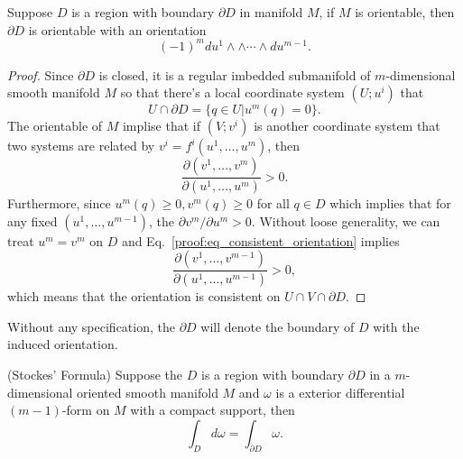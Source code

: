 \begin{theorem}
Suppose $D$ is a region with boundary $\partial D$ in manifold $M$, if $M$ is orientable, then $\partial D$ is orientable with an orientation
\begin{equation}
(-1)^mdu^1\wedge\wedge\cdots\wedge du^{m-1}.
\end{equation}
\end{theorem}
\begin{proof}
Since $\partial D$ is closed, it is a regular imbedded submanifold of $m$-dimensional smooth manifold $M$ so that there's a local coordinate system $(U;u^i)$ that
\begin{equation}
U\cap\partial D=\{q\in U|u^m(q)=0\}.
\end{equation}
The orientable of $M$ implise that if $(V;v^i)$ is another coordinate system that two systems are related by $v^i=f^i(u^1,\dots,u^m)$, then
\begin{equation}
\frac{\partial(v^1,\dots,v^m)}{\partial(u^1,\dots,u^m)}>0.
\end{equation}\label{proof:eq_consistent_orientation}
Furthermore, since $u^m(q)\ge 0,v^m(q)\ge 0$ for all $q\in D$ which implies that for any fixed $(u^1,\dots,u^{m-1})$, the $\partial v^m/\partial u^m>0$. Without loose generality, we can treat $u^m=v^m$ on $D$ and Eq.~\ref{proof:eq_consistent_orientation} implies
\begin{equation}
\frac{\partial(v^1,\dots,v^{m-1})}{\partial(u^1,\dots,u^{m-1})}>0,
\end{equation}
which means that the orientation is consistent on $U\cap V\cap \partial D$.
\end{proof}

Without any specification, the $\partial D$ will denote the boundary of $D$ with the induced orientation. 

\begin{theorem}(Stockes' Formula)
Suppose the $D$ is a region with boundary $\partial D$ in a $m$-dimensional oriented smooth manifold $M$ and $\omega$ is a exterior differential $(m-1)$-form on $M$ with a compact support, then
\begin{equation}
\int_Dd\omega=\int_{\partial D}\omega.
\end{equation} 
\end{theorem}

